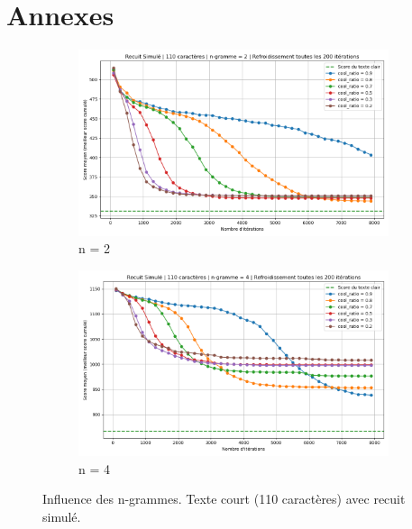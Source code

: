 \documentclass[a4paper]{article}
\begin{document}
\section*{Annexes}

\begin{figure}[H]
    \centering
    \begin{subfigure}[b]{0.49\textwidth}
        \includegraphics[width=\textwidth]{graphe_recuit_n_2_110_cool_time_200.png}
        \caption{n = 2}
        \label{fig:n2-110-200}
    \end{subfigure}
    \hfill
    \begin{subfigure}[b]{0.49\textwidth}
        \includegraphics[width=\textwidth]{graphe_recuit_n_4_110_cool_time_200.png}
        \caption{n = 4}
        \label{fig:n4-110-200}
    \end{subfigure}
    \caption{Influence des n-grammes. Texte court (110 caractères) avec recuit simulé.}
    \label{fig:rs-n2-n4-110}
\end{figure}
\end{document}
